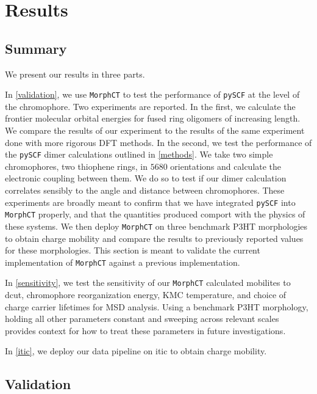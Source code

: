 \chapter{Results}
\label{results}

\section{Summary}

We present our results in three parts. 

In \autoref{validation}, we use \texttt{MorphCT} to test the performance of \texttt{pySCF} at the level of the chromophore.
Two experiments are reported. In the first, we calculate the frontier molecular orbital
energies for fused ring oligomers of increasing length. We compare the results of our experiment to the
results of the same experiment done with more rigorous DFT methods. In the second, we test the 
performance of the \texttt{pySCF} dimer calculations outlined in \autoref{methods}. 
We take two simple chromophores, two thiophene rings, in $5680$ orientations and calculate the
electronic coupling between them. We do so to test if our dimer calculation correlates sensibly to the angle
and distance between chromophores. These experiments are broadly meant to confirm that we have integrated
\texttt{pySCF} into \texttt{MorphCT} properly, and that the quantities produced comport with the physics of these systems.
We then deploy \texttt{MorphCT} on three benchmark P3HT morphologies to obtain charge mobility
and compare the results to previously reported values for these morphologies. This section is meant to
validate the current implementation of \texttt{MorphCT} against a previous implementation. 

In \autoref{sensitivity}, we test the sensitivity of our \texttt{MorphCT} calculated mobilites to dcut, chromophore
reorganization energy, KMC temperature, and choice of charge carrier lifetimes for MSD analysis. Using a
benchmark P3HT morphology, holding all other parameters constant and sweeping across relevant scales
provides context for how to treat these parameters in future investigations. 

In \autoref{itic}, we deploy our data pipeline on \gls{itic} to obtain charge mobility. 

\section{Validation}

\label{validation}

